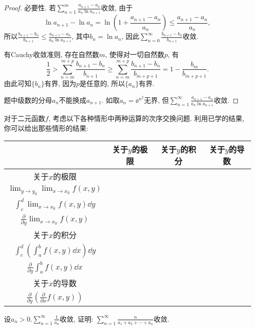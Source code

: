 \begin{quizb}
\begin{proof}
必要性. 若\(\sum_{n=1}^{m}\frac{a_{n+1}-a_n}{a_n\ln a_{n+1}}\)收敛, 由于\[\ln a_{n+1}-\ln a_n=\ln\left(1+\frac{a_{n+1}-a_n}{a_n}\right)\leqslant\frac{a_{n+1}-a_n}{a_n},\]所以\(\frac{b_{n+1}-b_n}{b_{n+1}}\leqslant\frac{a_{n+1}-a_{n}}{a_n\ln a_{n+1}}\), 其中\(b_n=\ln a_n\), 因此\(\sum_{n=0}^{\infty}\frac{b_{n+1}-b_n}{b_{n+1}}\)收敛.

有Cauchy收敛准则, 存在自然数\(m\), 使得对一切自然数\(p\), 有\[\frac{1}{2}>\sum_{n=m}^{m+p}\frac{b_{n+1}-b_n}{b_{n+1}}\geqslant\sum_{n=m}^{m+p}\frac{b_{n+1}-b_n}{b_{m+p+1}}=1-\frac{b_m}{b_{m+p+1}}.\]由此可知\(\{b_n\}\)有界, 因为\(p\)是任意的, 所以\(\{a_n\}\)有界.

题中级数的分母\(a_n\)不能换成\(a_{n+1}\). 如取\(a_n=\ee^{n^2}\)无界, 但\(\sum_{n=1}^{\infty}\frac{a_{n+1}-a_n}{a_n\ln a_{n+1}}\)收敛.
\end{proof}
\woe 对于二元函数\(f\), 考虑以下各种情形中两种运算的次序交换问题. 利用已学的结果, 你可以给出那些情形的结果:
\begin{center}
\begin{tabular}{c|c|c|c}
\hline
&关于\(y\)的极限&关于\(y\)的积分&关于\(y\)的导数\\\hline
关于\(x\)的极限&\makecell{\(\lim_{x\rightarrow x_0}\lim_{y\rightarrow y_0}f(x,y)=\)\\\(\lim_{y\rightarrow y_0}\lim_{x\rightarrow x_0}f(x,y)\)}&\makecell{\(\lim_{x\rightarrow x_0}\int_{c}^{d}f(x,y)\dd y=\)\\\(\int_{c}^{d}\lim_{x\rightarrow x_0}f(x,y)\dd y\)}&\makecell{\(\lim_{x\rightarrow x_0}\frac{\partial}{\partial y}f(x,y)=\)\\\(\frac{\partial}{\partial y}\lim_{x\rightarrow x_0}f(x,y)\)}\\\hline
关于\(x\)的积分& &\makecell{\(\int_{a}^{b}\left(\int_{c}^{d}f(x,y)\dd y\right)\dd x=\)\\\(\int_{c}^{d}\left(\int_{a}^{b}f(x,y)\dd x\right)\dd y\)}&\makecell{\(\int_{a}^{b}\frac{\partial}{\partial y}f(x,y)\dd x=\)\\\(\frac{\partial}{\partial y}\int_{a}^{b}f(x,y)\dd x\)} \\\hline
关于\(x\)的导数& & &\makecell{\(\frac{\partial}{\partial x}\left(\frac{\partial}{\partial y}f(x,y)\right)=\)\\\(\frac{\partial}{\partial y}\left(\frac{\partial}{\partial x}f(x,y)\right)\)}\\\hline
\end{tabular}
\end{center}
\woe 设\(a_n>0.\sum_{n=1}^{\infty}\frac{1}{a_n}\)收敛, 证明: \(\sum_{n=1}^{\infty}\frac{n}{a_1+a_2+\cdots+a_n}\)收敛.

\end{quizb}
